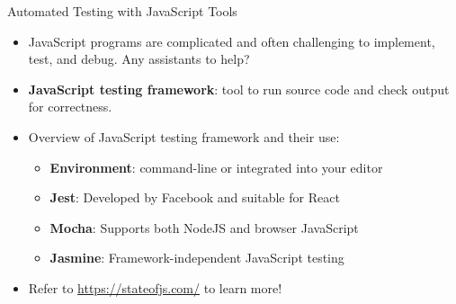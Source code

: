 \documentclass[14pt,aspectratio=169]{beamer}
\begin{document}
%
\begin{frame}{Automated Testing with JavaScript Tools}
  \begin{itemize}
    \item JavaScript programs are complicated and often challenging to
      implement, test, and debug. Any assistants to help?
      \vspace*{-.15in}
    \item {\bf JavaScript testing framework}: tool to run source code and check
      output for correctness.
      \vspace*{-.15in}
    \item Overview of JavaScript testing framework and their use:
      \begin{itemize}
        \item {\bf Environment}: command-line or integrated into your editor
        \item {\bf Jest}: Developed by Facebook and suitable for React
        \item {\bf Mocha}: Supports both NodeJS and browser JavaScript
        \item {\bf Jasmine}: Framework-independent JavaScript testing
      \end{itemize}
      \vspace*{-.25in}
    \item Refer to \url{https://stateofjs.com/} to learn more!
  \end{itemize}
\end{frame}
\end{document}
